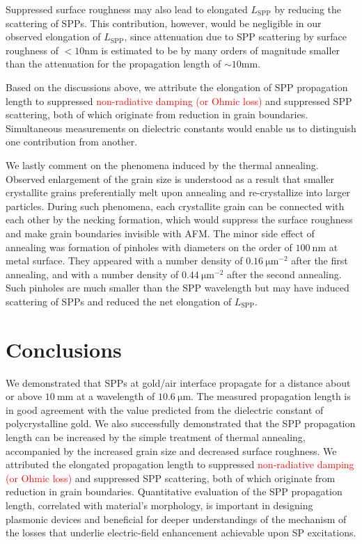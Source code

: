 \documentclass[aip,apl,reprint]{revtex4-1}
\begin{document}
 
Suppressed surface roughness may also lead to elongated $L_{\mathrm{SPP}}$ by reducing the scattering of SPPs. This contribution, however, would be negligible in our observed elongation of $L_{\mathrm{SPP}}$, since attenuation due to SPP scattering by surface roughness of $<10 \mathrm{nm}$ is estimated to be by many orders of magnitude smaller than the attenuation for the propagation length of $\sim10 \mathrm{mm}$\cite{Shiba, Kuttge, Mills}.

Based on the discussions above, we attribute the elongation of SPP propagation length to suppressed \textcolor{red}{non-radiative damping (or Ohmic loss)} and suppressed SPP scattering, both of which originate from reduction in grain boundaries. Simultaneous measurements on dielectric constants would enable us to distinguish one contribution from another.

We lastly comment on the phenomena induced by the thermal annealing.
Observed enlargement of the grain size is understood as a result that smaller crystallite grains preferentially melt upon annealing\cite{Buffat} and re-crystallize into larger particles. 
During such phenomena, each crystallite grain can be connected with each other by the necking formation, which would suppress the surface roughness and make grain boundaries invisible with AFM. The minor side effect of annealing was formation of pinholes with diameters on the order of $100\:\mathrm{nm}$ at metal surface. They appeared with a number density of $0.16\:\mathrm{\mu m}^{-2}$ after the first annealing, and with a number density of $0.44\:\mathrm{\mu m}^{-2}$ after the second annealing. Such pinholes are much smaller than the SPP wavelength but may have induced scattering of SPPs and reduced the net elongation of $L_{\mathrm{SPP}}$.
	
\section{Conclusions}
\label{sec:conclusion}
We demonstrated that SPPs at gold/air interface propagate for a distance about or above $10\:\mathrm{mm}$ at a wavelength of $10.6\:\mathrm{\mu m}$. The measured propagation length is in good agreement with the value predicted from the dielectric constant of polycrystalline gold. We also successfully demonstrated that the SPP propagation length can be increased by the simple treatment of thermal annealing, accompanied by the increased grain size and decreased surface roughness. 
We attributed the elongated propagation length to suppressed \textcolor{red}{non-radiative damping (or Ohmic loss)} and suppressed SPP scattering, both of which originate from reduction in grain boundaries. 
Quantitative evaluation of the SPP propagation length, correlated with material's morphology, is important in designing plasmonic devices and beneficial for deeper understandings of the mechanism of the losses that underlie electric-field enhancement achievable upon SP excitations.
\end{document}

